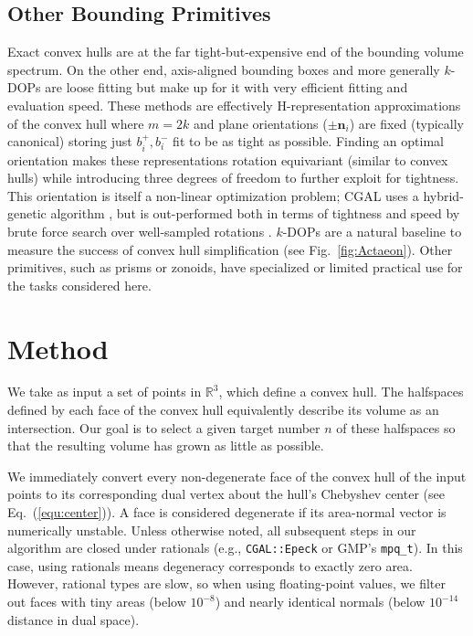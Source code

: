 \documentclass{egpubl}
\newcommand{\Hrep}{H-representation\xspace}
\newcommand{\n}{\mathbf{n}}
\begin{document}
\subsection{Other Bounding Primitives}
Exact convex hulls are at the far tight-but-expensive end of the bounding volume spectrum.
On the other end, axis-aligned bounding boxes and more generally $k$-DOPs are loose fitting but make up for it with very efficient fitting and evaluation speed.
These methods are effectively \Hrep approximations of the convex hull where $m=2k$ and plane orientations ($\pm\n_i$) are fixed (typically canonical) storing just $b^+_i,b^-_i$ fit to be as tight as possible.
Finding an optimal orientation makes these representations rotation equivariant (similar to convex hulls) while introducing three degrees of freedom to further exploit for tightness.
This orientation is itself a non-linear optimization problem; \textsc{CGAL} uses a hybrid-genetic algorithm \cite{ChangGM11}, but is out-performed both in terms of tightness and speed by brute force search over well-sampled rotations \cite{Alexa22}. %
$k$-DOPs are a natural baseline to measure the success of convex hull simplification (see Fig.~\ref{fig:Actaeon}).
Other primitives, such as prisms or zonoids, have specialized or limited practical use for the tasks considered here.





\section{Method}
We take as input a set of points in $\mathbb{R}^3$, which define a convex hull.
The halfspaces defined by each face of the convex hull equivalently describe its volume as an intersection.
Our goal is to select a given target number $n$ of these halfspaces so that the resulting volume has grown as little as possible.

We immediately convert every non-degenerate face of the convex hull of the input points to its corresponding dual vertex about the hull's Chebyshev center (see Eq.~(\ref{equ:center})).
A face is considered degenerate if its area-normal vector is numerically unstable. 
Unless otherwise noted,
all subsequent steps in our algorithm are closed under rationals (e.g., \texttt{CGAL::Epeck} or \textsc{GMP}'s \texttt{mpq\_t}). In this case, using rationals means degeneracy corresponds to exactly zero area.
However, rational types are slow, so when using floating-point values, we filter out faces with tiny areas (below $10^{-8}$) and nearly identical normals (below $10^{-14}$ distance in dual space).
\end{document}
